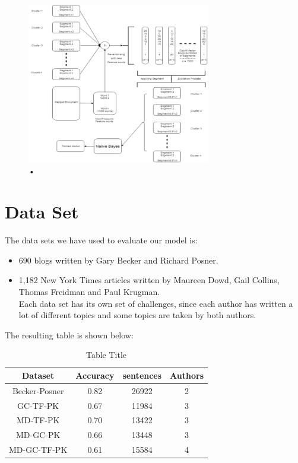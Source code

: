\documentclass[letterpaper]{article}
\begin{document}
\begin{figure}
\caption{•}
\includegraphics[width=8cm]{u6.jpg}
\centering
\end{figure}

\section{Data Set}
The data sets we have used to evaluate our model is:
\begin{itemize}
\item 690 blogs written by Gary Becker and Richard Posner.
\item	1,182 New York Times articles written by Maureen Dowd, Gail Collins, Thomas Freidman and Paul Krugman.\\
Each data set has its own set of challenges, since each author has written a lot of different topics and some topics are taken by both authors.
\end{itemize}
The resulting table is shown below:
\begin {table}[h]
\caption {Table Title} \label{tab:title} 
\begin{center}
 \begin{tabular}{||c c c c||}
 \hline
 Dataset & Accuracy & sentences & Authors \\ [0.5ex] 
 \hline\hline
 Becker-Posner & 0.82 & 26922 & 2 \\ 
 \hline
 GC-TF-PK & 0.67 & 11984 & 3 \\
 \hline
 MD-TF-PK & 0.70 & 13422 & 3 \\
 \hline
 MD-GC-PK & 0.66 & 13448 & 3 \\
 \hline
 MD-GC-TF-PK & 0.61 & 15584 & 4 \\ [1ex] 
 \hline
\end{tabular}
\end{center}
\end{table}
\end{document}
